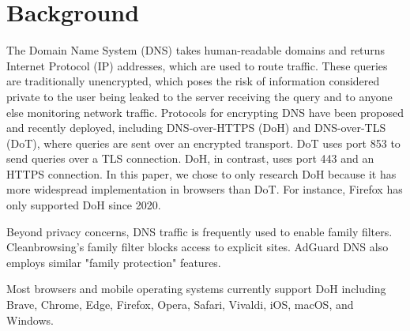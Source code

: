\section{Background}\label{sec:back}

The Domain Name System (DNS) takes human-readable domains and returns Internet Protocol (IP) addresses, which are used to route traffic. 
These queries are traditionally unencrypted, which poses the risk of information considered private to the user being leaked to the server receiving the query and to anyone else monitoring network traffic.
Protocols for encrypting DNS have been proposed and recently deployed, including DNS-over-HTTPS (DoH) and DNS-over-TLS (DoT), where queries are sent over an encrypted transport.
DoT uses port 853 to send queries over a TLS connection. 
DoH, in contrast, uses port 443 and an HTTPS connection. 
In this paper, we chose to only research DoH because it has more widespread implementation in browsers than DoT.
For instance, Firefox has only supported DoH since 2020. 

Beyond privacy concerns, DNS traffic is frequently used to enable family filters. 
Cleanbrowsing's family filter blocks access to explicit sites. 
AdGuard DNS also employs similar "family protection" features.

Most browsers and mobile operating systems currently support DoH including Brave, Chrome, Edge, Firefox, Opera, Safari, Vivaldi, iOS, macOS, and Windows. 